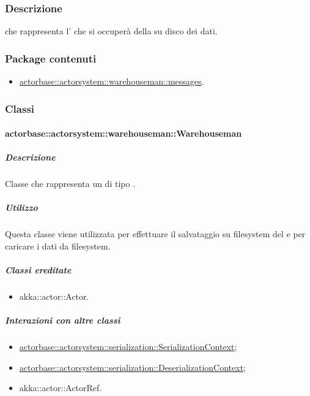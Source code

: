 \documentclass{scalatekids-article}
\begin{document}
\subsubsection{Descrizione}

 che rappresenta l' che si occuperà della
 su disco dei dati.

\subsubsection{Package contenuti}

\begin{itemize}

\item \hyperref[sec:actorbase::actorsystem::warehouseman::messages]{actorbase::actorsystem::warehouseman::messages}.

\end{itemize}

\subsubsection{Classi}

\paragraph{actorbase::actorsystem::warehouseman::Warehouseman}
\label{sec:actorbase::actorsystem::warehouseman::Warehouseman}

\subparagraph{Descrizione}

Classe che rappresenta un  di tipo .

\subparagraph{Utilizzo}

Questa classe viene utilizzata per effettuare il salvataggio su filesystem del
 e per caricare i dati da filesystem.

\subparagraph{Classi ereditate}

\begin{itemize}

\item akka::actor::Actor.

\end{itemize}

\subparagraph{Interazioni con altre classi}

\begin{itemize}
\item \hyperref[sec:actorbase::actorsystem::serialization::SerializationContext]{actorbase::actorsystem::serialization::SerializationContext};
\item \hyperref[sec:actorbase::actorsystem::serialization::DeserializationContext]{actorbase::actorsystem::serialization::DeserializationContext};
\item akka::actor::ActorRef.
\end{itemize}
\end{document}
